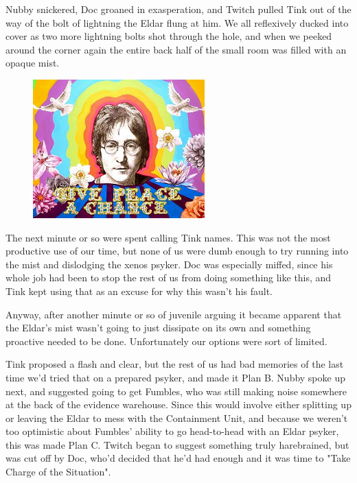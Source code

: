 Nubby snickered, Doc groaned in exasperation, and Twitch pulled Tink out of the way of the bolt of lightning the Eldar flung at him. 
We all reflexively ducked into cover as two more lightning bolts shot through the hole, and when we peeked around the corner again the entire back half of the small room was filled with an opaque mist.

\begin{figure}
	\begin{center}
		\includegraphics[width=\figwidth]{pics/16/27.png}
	\end{center}
\end{figure}
The next minute or so were spent calling Tink names. 
This was not the most productive use of our time, but none of us were dumb enough to try running into the mist and dislodging the xenos psyker. 
Doc was especially miffed, since his whole job had been to stop the rest of us from doing something like this, and Tink kept using that as an excuse for why this wasn't his fault.

Anyway, after another minute or so of juvenile arguing it became apparent that the Eldar's mist wasn't going to just dissipate on its own and something proactive needed to be done. 
Unfortunately our options were sort of limited. 


Tink proposed a flash and clear, but the rest of us had bad memories of the last time we'd tried that on a prepared psyker, and made it Plan B. 
Nubby spoke up next, and suggested going to get Fumbles, who was still making noise somewhere at the back of the evidence warehouse. 
Since this would involve either splitting up or leaving the Eldar to mess with the Containment Unit, and because we weren't too optimistic about Fumbles' ability to go head-to-head with an Eldar psyker, this was made Plan C. 
Twitch began to suggest something truly harebrained, but was cut off by Doc, who'd decided that he'd had enough and it was time to "Take Charge of the Situation". 


